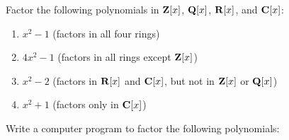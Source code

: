 \begin{comment}

\mysection{Axiom Soup}

At this point, the reader might begin to suspect that we build up a
theory from our axioms, and whenever we get stuck, we introduce a new
axiom so that we can move forward!  In a sense, this is true, but
don't miss an important point.  While the axioms are axioms in the
sense that you can't prove U1 or I1 for an arbitrary ring (i.e, just
given the R axioms), they are also theorems in the sense that we can
prove them for the particular systems of interest to us.  We prove the
axioms both for our base system ${\bf Z}$ (the integers form a unique
factorization domain), and for any constructed system ${\cal F}[x]$ (a
polynomial ring in a single {\it transcendental} variable over a field
is also a unique factorization domain).

Let me close this chapter by proving this in a series of theorems.

\end{comment}

\vfill\eject
{}

Factor the following polynomials in ${\bf Z}[x]$, ${\bf Q}[x]$, ${\bf R}[x]$, and ${\bf C}[x]$:

\begin{enumerate}
\item $x^2-1$  (factors in all four rings)
\item $4x^2-1$ (factors in all rings except ${\bf Z}[x]$)
\item $x^2-2$  (factors in ${\bf R}[x]$ and ${\bf C}[x]$, but not in ${\bf Z}[x]$ or ${\bf Q}[x]$)
\item $x^2+1$  (factors only in ${\bf C}[x]$)
\end{enumerate}

Write a computer program to factor the following polynomials:

